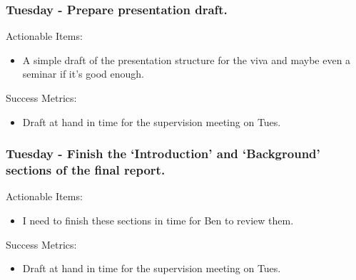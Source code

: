 \subsubsection{Tuesday - Prepare presentation draft.}

Actionable Items:

\begin{itemize}
    \item A simple draft of the presentation structure for the viva and maybe even a seminar if it's good enough.
\end{itemize}

Success Metrics:

\begin{itemize}
    \item Draft at hand in time for the supervision meeting on Tues.
\end{itemize}



\subsubsection{Tuesday - Finish the `Introduction' and `Background' sections of the final report.}

Actionable Items:

\begin{itemize}
    \item I need to finish these sections in time for Ben to review them.
\end{itemize}

Success Metrics:

\begin{itemize}
    \item Draft at hand in time for the supervision meeting on Tues.
\end{itemize}
